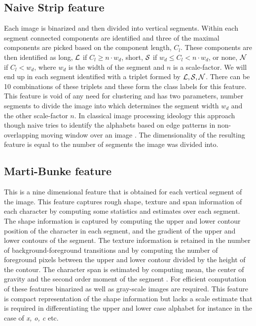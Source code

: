 \documentclass[runningheads]{llncs}
\def\L{{\cal L}}
\def\S{{\cal S}}
\def\N{{\cal N}}
\begin{document}
\subsection{Naive Strip feature}
\label{ssec:nsf}
Each image is binarized and then divided into vertical segments. Within each segment connected components are identified and three of the maximal components are picked based on the component length, $C_l$. These components are then identified as long, $\L$ if $C_l \ge n\cdot w_d$, short, $\S$ if $w_d \le C_l < n \cdot w_d$, or none, $\N$ if $ C_l < w_d$, where $w_d$ is the width of the segment and $n$ is a scale-factor. We will end up in each segment identified with a triplet formed by $\L,\S,\N$. There can be 10 combinations of these triplets and these form the class labels for this feature. This feature is void of any need for clustering and has two parameters, number segments to divide the image into which determines the segment width $w_d$ and the other scale-factor $n$. In classical image processing ideology this approach though naive tries to identify the alphabets based on edge patterns in non-overlapping moving window  over an image  \cite{Cheriet}. The dimensionality of the resulting feature is equal to the number of segments the image was divided into.

\subsection{Marti-Bunke feature}
\label{ssec:mbf}
This is a nine dimensional feature that is obtained for each vertical segment of the image. This feature captures rough shape, texture and span information of each character by computing some statistics and estimates over each segment. The shape information is captured by computing the upper and lower contour position of the character in each segment, and the gradient of the upper and lower contours of the segment. The texture information is retained in the number of background-foreground transitions and by computing the number of foreground pixels between the  upper and lower contour divided by the height of the contour. The character span is estimated by computing mean, the center of gravity and the second order moment of the segment \cite{MartiBunke02}. For efficient computation of these features binarized as well as gray-scale images are required. This feature is compact representation of the shape information but lacks a scale estimate that is required in differentiating the upper and lower case alphabet for instance in the case  of \emph{x, o, c} etc.
\end{document}
